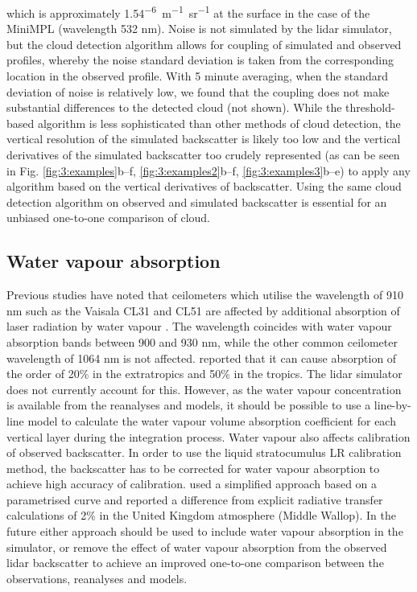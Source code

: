 which is approximately 1.54\unit{^{-6}m^{-1}sr^{-1}} at the
surface in the case of the MiniMPL (wavelength 532 nm).
Noise is not simulated by the lidar simulator, but the cloud detection
algorithm allows for coupling of simulated and observed profiles, whereby
the noise standard deviation is taken from the corresponding location in the 
observed profile. With 5 minute averaging, when the standard deviation of noise
is relatively low, we found that the coupling does not make substantial
differences to the detected cloud (not shown). While the threshold-based algorithm is
less sophisticated than other methods of cloud detection, the vertical
resolution of the simulated backscatter is likely too low and the vertical
derivatives of the simulated backscatter too crudely represented (as can be seen in Fig. \ref{fig:3:examples}b--f, \ref{fig:3:examples2}b--f, \ref{fig:3:examples3}b--e) to apply any algorithm
based on the vertical derivatives of backscatter. Using the same cloud detection
algorithm on observed and simulated backscatter is essential for an unbiased
one-to-one comparison of cloud.

\subsection{Water vapour absorption}
\label{sec:3:water-vapour-absorption}

Previous studies have noted that ceilometers which utilise the wavelength
of 910 nm such as the Vaisala CL31 and CL51 are affected by additional
absorption of laser radiation by water vapour \citep{wiegner2015,wiegner2019,hopkin2019}.
The wavelength coincides with water vapour absorption bands between 900 and 930
nm, while the other common ceilometer wavelength of 1064 nm is not affected.
\cite{wiegner2015} reported that it can cause absorption of the order of 20\% in
the extratropics and 50\% in the tropics. The lidar simulator does not currently
account for this. However, as the water vapour concentration is available
from the reanalyses and models, it should be possible to use a line-by-line
model to calculate the water vapour volume absorption coefficient for each
vertical layer during the integration process. Water vapour also affects
calibration of observed backscatter. In order to use the liquid stratocumulus
LR calibration method, the backscatter has to be corrected for 
water vapour absorption to achieve high accuracy of calibration.
\cite{hopkin2019} used a simplified approach based on a parametrised curve
and reported a difference from explicit radiative transfer calculations 
of 2\% in the United Kingdom atmosphere (Middle Wallop). In the future either approach
should be used to include water vapour absorption in the simulator, or
remove the effect of water vapour absorption from the observed lidar backscatter
to achieve an improved one-to-one comparison between the observations,
reanalyses and models.

